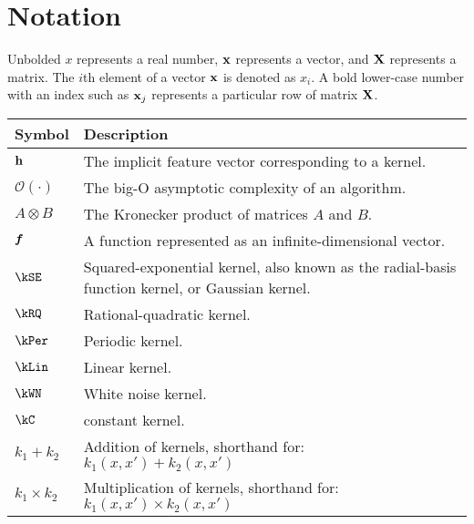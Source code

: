 
\inbpdocument

\chapter*{Notation}
\label{ch:notation}


Unbolded $x$ represents a real number, ${\bf{x}}$ represents a vector, and $\mathbf{X}$ represents a matrix.
The $i$th element of a vector ${\bf{x}}$ is denoted as $x_i$.
A bold lower-case number with an index such as ${\bf{x}}_j$ represents a particular row of matrix $\mathbf{X}$.

\vspace{1cm}

\begin{tabular}{lm{12cm}}
Symbol \quad     & Description \\
\hline
${\bf{h}}$       & The implicit feature vector corresponding to a kernel. \\
$\mathcal{O}(\cdot)$ & The big-O asymptotic complexity of an algorithm. \\
$A \otimes B$ & The Kronecker product of matrices $A$ and $B$. \\
$\boldsymbol{f}$ & A function represented as an infinite-dimensional vector. \\
$\kSE$ & Squared-exponential kernel, also known as the radial-basis function kernel, or Gaussian kernel. \\
$\kRQ$ & Rational-quadratic kernel. \\
$\kPer$ & Periodic kernel. \\
$\kLin$ & Linear kernel. \\
$\kWN$ & White noise kernel. \\
$\kC$ & constant kernel. \\
$k_1 + k_2$ & Addition of kernels, shorthand for: $k_1(x,x') + k_2(x,x')$ \\
$k_1 \times k_2$& Multiplication of kernels, shorthand for: $k_1(x,x') \times k_2(x,x')$ \\
\end{tabular}

\outbpdocument{
}


